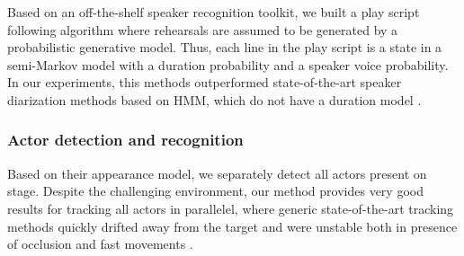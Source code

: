 \documentclass[conference]{IEEEtran}
\newcommand{\todo}[1]{\noindent\textcolor{red}{{\bf \{ToDo} #1{\bf \}}}}
\begin{document}
Based on an off-the-shelf speaker recognition toolkit, we built a play script following algorithm where rehearsals are assumed to be generated by a probabilistic generative model.  Thus, each  line in the play script is a state in a semi-Markov model with a duration probability and a speaker voice probability. In our experiments, this methods outperformed state-of-the-art speaker diarization methods based on HMM, which do not have a duration model \cite{Migniot15}. 




\subsubsection{Actor detection and recognition} 

Based on their appearance model, we separately detect all actors present on stage. Despite the challenging environment, our method provides very good results for tracking all actors in parallelel, where generic state-of-the-art tracking methods quickly drifted away from the target and were unstable both in presence of occlusion and fast movements \cite{Gandhi13,Migniot15}.

\end{document}
